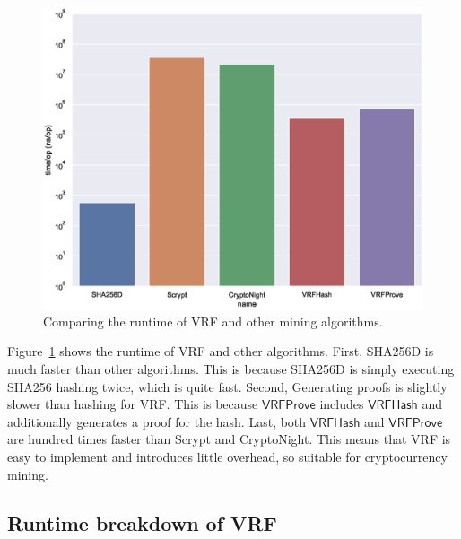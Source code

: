 \begin{figure}[htp]
    \centering
    \includegraphics[width=.7\linewidth]{figs/runtime-comparison.eps}
    \caption{Comparing the runtime of VRF and other mining algorithms.}
    \label{fig:runtime-comparison}
\end{figure}

Figure~\ref{fig:runtime-comparison} shows the runtime of VRF and other algorithms.
First, SHA256D is much faster than other algorithms.
This is because SHA256D is simply executing SHA256 hashing twice, which is quite fast.
Second, Generating proofs is slightly slower than hashing for VRF.
This is because $\mathsf{VRFProve}$ includes $\mathsf{VRFHash}$ and additionally generates a proof for the hash.
Last, both $\mathsf{VRFHash}$ and $\mathsf{VRFProve}$ are hundred times faster than Scrypt and CryptoNight.
This means that VRF is easy to implement and introduces little overhead, so suitable for cryptocurrency mining.



\subsection{Runtime breakdown of VRF}


